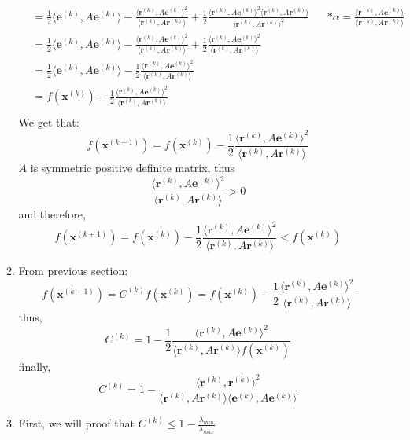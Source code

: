 \documentclass{article}
\begin{document}
\begin{enumerate}[(a)]
\begin{enumerate}[label=(\roman*)]
\begin{align*}
&= \frac{1}{2}\langle\mathbf{e}^{(k)}, A\mathbf{e}^{(k)}\rangle - \frac{\langle\mathbf{r}^{(k)}, A\mathbf{e}^{(k)}\rangle^2}{\langle\mathbf{r}^{(k)}, A\mathbf{r}^{(k)}\rangle} + \frac{1}{2}\frac{\langle\mathbf{r}^{(k)}, A\mathbf{e}^{(k)}\rangle^2\langle\mathbf{r}^{(k)}, A\mathbf{r}^{(k)}\rangle}{\langle\mathbf{r}^{(k)}, A\mathbf{r}^{(k)}\rangle^2} && *\alpha = \frac{\langle\mathbf{r}^{(k)}, A\mathbf{e}^{(k)}\rangle}{\langle\mathbf{r}^{(k)}, A\mathbf{r}^{(k)}\rangle}\\
&= \frac{1}{2}\langle\mathbf{e}^{(k)}, A\mathbf{e}^{(k)}\rangle - \frac{\langle\mathbf{r}^{(k)}, A\mathbf{e}^{(k)}\rangle^2}{\langle\mathbf{r}^{(k)}, A\mathbf{r}^{(k)}\rangle} + \frac{1}{2}\frac{\langle\mathbf{r}^{(k)}, A\mathbf{e}^{(k)}\rangle^2}{\langle\mathbf{r}^{(k)}, A\mathbf{r}^{(k)}\rangle}\\
&= \frac{1}{2}\langle\mathbf{e}^{(k)}, A\mathbf{e}^{(k)}\rangle - \frac{1}{2}\frac{\langle\mathbf{r}^{(k)}, A\mathbf{e}^{(k)}\rangle^2}{\langle\mathbf{r}^{(k)}, A\mathbf{r}^{(k)}\rangle}\\
&= f(\mathbf{x}^{(k)}) - \frac{1}{2}\frac{\langle\mathbf{r}^{(k)}, A\mathbf{e}^{(k)}\rangle^2}{\langle\mathbf{r}^{(k)}, A\mathbf{r}^{(k)}\rangle}\\
\end{align*}
We get that:
\[f(\mathbf{x}^{(k+1)}) = f(\mathbf{x}^{(k)}) - \frac{1}{2}\frac{\langle\mathbf{r}^{(k)}, A\mathbf{e}^{(k)}\rangle^2}{\langle\mathbf{r}^{(k)}, A\mathbf{r}^{(k)}\rangle}\]
$A$ is symmetric positive definite matrix, thus
\[\frac{\langle\mathbf{r}^{(k)}, A\mathbf{e}^{(k)}\rangle^2}{\langle\mathbf{r}^{(k)}, A\mathbf{r}^{(k)}\rangle}>0\]
and therefore,
\[f(\mathbf{x}^{(k+1)}) = f(\mathbf{x}^{(k)}) - \frac{1}{2}\frac{\langle\mathbf{r}^{(k)}, A\mathbf{e}^{(k)}\rangle^2}{\langle\mathbf{r}^{(k)}, A\mathbf{r}^{(k)}\rangle} <  f(\mathbf{x}^{(k)})\]
\item From previous section:
\[f(\mathbf{x}^{(k+1)}) = C^{(k)} f(\mathbf{x}^{(k)}) = f(\mathbf{x}^{(k)}) - \frac{1}{2}\frac{\langle\mathbf{r}^{(k)}, A\mathbf{e}^{(k)}\rangle^2}{\langle\mathbf{r}^{(k)}, A\mathbf{r}^{(k)}\rangle} \]
thus,
\[C^{(k)} = 1- \frac{1}{2}\frac{\langle\mathbf{r}^{(k)}, A\mathbf{e}^{(k)}\rangle^2}{\langle\mathbf{r}^{(k)}, A\mathbf{r}^{(k)}\rangle f(\mathbf{x}^{(k)})}\]
finally,
\[C^{(k)} = 1- \frac{\langle\mathbf{r}^{(k)}, \mathbf{r}^{(k)}\rangle^2}{\langle\mathbf{r}^{(k)}, A\mathbf{r}^{(k)}\rangle \langle \mathbf{e}^{(k)}, A\mathbf{e}^{(k)}\rangle}\]
\item First, we will proof that $C^{(k)} \leq 1-\frac{\lambda_{min}} {\lambda_{max}}$


\end{enumerate}
\end{enumerate}
\end{document}
